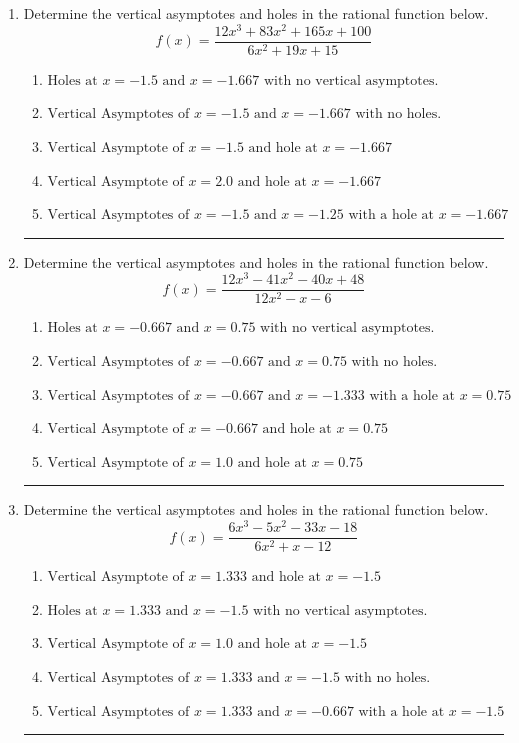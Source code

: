 \documentclass[14pt]{extbook}
\newcommand{\litem}[1]{\item#1\hspace*{-1cm}\rule{\textwidth}{0.4pt}}
\begin{document}
\begin{enumerate}
{\begin{enumerate}[label=\Alph*.]
\end{enumerate} }
\litem{
Determine the vertical asymptotes and holes in the rational function below.\[ f(x) = \frac{12x^{3} +83 x^{2} +165 x + 100}{6x^{2} +19 x + 15} \]\begin{enumerate}[label=\Alph*.]
\item \( \text{Holes at } x = -1.5 \text{ and } x = -1.667 \text{ with no vertical asymptotes.} \)
\item \( \text{Vertical Asymptotes of } x = -1.5 \text{ and } x = -1.667 \text{ with no holes.} \)
\item \( \text{Vertical Asymptote of } x = -1.5 \text{ and hole at } x = -1.667 \)
\item \( \text{Vertical Asymptote of } x = 2.0 \text{ and hole at } x = -1.667 \)
\item \( \text{Vertical Asymptotes of } x = -1.5 \text{ and } x = -1.25 \text{ with a hole at } x = -1.667 \)

\end{enumerate} }
\litem{
Determine the vertical asymptotes and holes in the rational function below.\[ f(x) = \frac{12x^{3} -41 x^{2} -40 x + 48}{12x^{2} -x -6} \]\begin{enumerate}[label=\Alph*.]
\item \( \text{Holes at } x = -0.667 \text{ and } x = 0.75 \text{ with no vertical asymptotes.} \)
\item \( \text{Vertical Asymptotes of } x = -0.667 \text{ and } x = 0.75 \text{ with no holes.} \)
\item \( \text{Vertical Asymptotes of } x = -0.667 \text{ and } x = -1.333 \text{ with a hole at } x = 0.75 \)
\item \( \text{Vertical Asymptote of } x = -0.667 \text{ and hole at } x = 0.75 \)
\item \( \text{Vertical Asymptote of } x = 1.0 \text{ and hole at } x = 0.75 \)

\end{enumerate} }
\litem{
Determine the vertical asymptotes and holes in the rational function below.\[ f(x) = \frac{6x^{3} -5 x^{2} -33 x -18}{6x^{2} +x -12} \]\begin{enumerate}[label=\Alph*.]
\item \( \text{Vertical Asymptote of } x = 1.333 \text{ and hole at } x = -1.5 \)
\item \( \text{Holes at } x = 1.333 \text{ and } x = -1.5 \text{ with no vertical asymptotes.} \)
\item \( \text{Vertical Asymptote of } x = 1.0 \text{ and hole at } x = -1.5 \)
\item \( \text{Vertical Asymptotes of } x = 1.333 \text{ and } x = -1.5 \text{ with no holes.} \)
\item \( \text{Vertical Asymptotes of } x = 1.333 \text{ and } x = -0.667 \text{ with a hole at } x = -1.5 \)


\end{enumerate}}
\end{enumerate}
\end{document}
